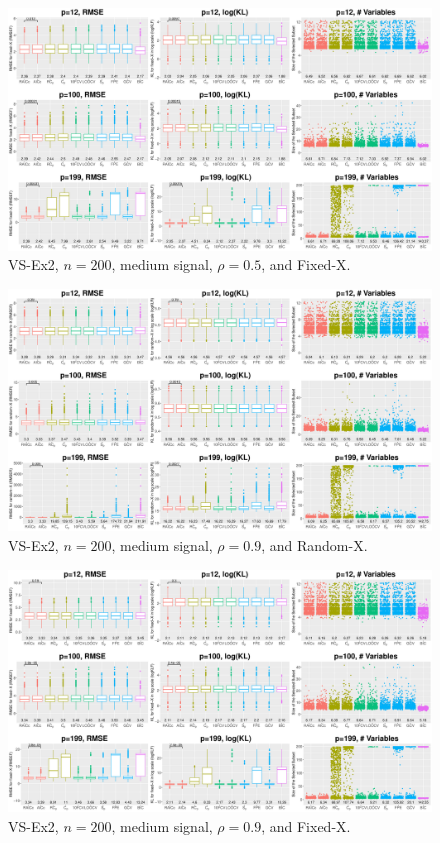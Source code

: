 \begin{figure}[!ht]
\centering
\includegraphics[width=\textwidth]{figures/supplement/fixedx_VS-Ex2_n200_msnr_rho05.eps}
\caption{VS-Ex2, $n=200$, medium signal, $\rho=0.5$, and Fixed-X.}
\end{figure}
\clearpage
\begin{figure}[!ht]
\centering
\includegraphics[width=\textwidth]{figures/supplement/randomx_VS-Ex2_n200_msnr_rho09.eps}
\caption{VS-Ex2, $n=200$, medium signal, $\rho=0.9$, and Random-X.}
\end{figure}
\begin{figure}[!ht]
\centering
\includegraphics[width=\textwidth]{figures/supplement/fixedx_VS-Ex2_n200_msnr_rho09.eps}
\caption{VS-Ex2, $n=200$, medium signal, $\rho=0.9$, and Fixed-X.}
\end{figure}
